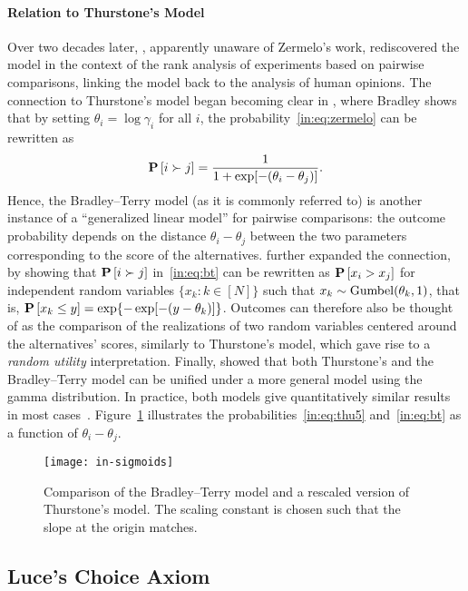 \paragraph{Relation to Thurstone's Model}
Over two decades later, \citet{bradley1952rank}, apparently unaware of Zermelo's work, rediscovered the model in the context of the rank analysis of experiments based on pairwise comparisons, linking the model back to the analysis of human opinions.
The connection to Thurstone's model began becoming clear in \citet{bradley1953some}, where Bradley shows that by setting $\theta_i = \log \gamma_i$ for all $i$, the probability~\eqref{in:eq:zermelo} can be rewritten as
\begin{align}
\label{in:eq:bt}
\mathbf{P}\left[ i \succ j \right] = \frac{1}{1 + \exp[-(\theta_i - \theta_j)]}.
\end{align}
Hence, the Bradley--Terry model (as it is commonly referred to) is another instance of a ``generalized linear model'' for pairwise comparisons: the outcome probability depends on the distance $\theta_i - \theta_j$ between the two parameters corresponding to the score of the alternatives.
\citet{yellot1977relationship} further expanded the connection, by showing that $\mathbf{P}\left[ i \succ j \right]$ in~\eqref{in:eq:bt} can be rewritten as $\mathbf{P}\left[ x_i > x_j \right]$ for independent random variables $\{x_k : k \in [N]\}$ such that $x_k \sim \mathrm{Gumbel}( \theta_k, 1 )$, that is, $\mathbf{P}\left[ x_k \le y \right] = \exp\{-\exp[-(y - \theta_k)]\}$.
Outcomes can therefore also be thought of as the comparison of the realizations of two random variables centered around the alternatives' scores, similarly to Thurstone's model, which gave rise to a \emph{random utility} interpretation.
Finally, \citet{stern1992all} showed that both Thurstone's and the Bradley--Terry model can be unified under a more general model using the gamma distribution.
In practice, both models give quantitatively similar results in most cases~\citep{tsukida2011how}.
Figure~\ref{in:fig:sigmoids} illustrates the probabilities~\eqref{in:eq:thu5} and~\eqref{in:eq:bt} as a function of $\theta_i - \theta_j$.

\begin{figure}
\centering
\texttt{[image: in-sigmoids]}
\caption{
Comparison of the Bradley--Terry model and a rescaled version of Thurstone's model.
The scaling constant is chosen such that the slope at the origin matches.
}
\label{in:fig:sigmoids}
\end{figure}


\subsection{Luce's Choice Axiom}
\label{in:sec:choice}


